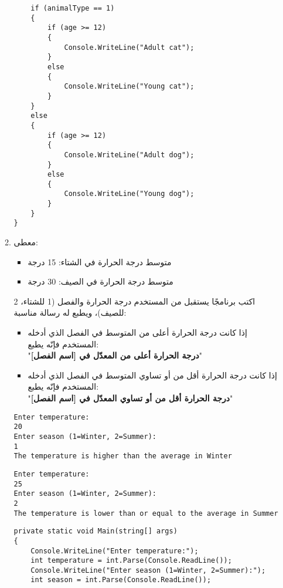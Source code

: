 \documentclass[12pt, twoside]{article}
\begin{document}
\begin{enumerate}[itemsep=3em]
\begin{enumerate}
\begin{solution}
\begin{english}
\begin{verbatim}
    if (animalType == 1)
    {
        if (age >= 12)
        {
            Console.WriteLine("Adult cat");
        }
        else
        {
            Console.WriteLine("Young cat");
        }
    }
    else
    {
        if (age >= 12)
        {
            Console.WriteLine("Adult dog");
        }
        else
        {
            Console.WriteLine("Young dog");
        }
    }
}
\end{verbatim}
\end{english}
\end{solution}
\clearpage
\fi
\fi

\item
معطى:
\begin{itemize}
\item متوسط درجة الحرارة في الشتاء: 15 درجة
\item متوسط درجة الحرارة في الصيف: 30 درجة
\end{itemize}
اكتب برنامجًا يستقبل من المستخدم درجة الحرارة والفصل (1 للشتاء، 2 للصيف)، ويطبع له رسالة مناسبة:
\begin{itemize}
\item إذا كانت درجة الحرارة أعلى من المتوسط في الفصل الذي أدخله المستخدم فإنّه يطبع: \\ "\textbf{درجة الحرارة أعلى من المعدّل في [اسم الفصل]}"
\item إذا كانت درجة الحرارة أقل من أو تساوي المتوسط في الفصل الذي أدخله المستخدم فإنّه يطبع: \\ "\textbf{درجة الحرارة أقل من أو تساوي المعدّل في [اسم الفصل]}"
\end{itemize}
\ifdetailed
\begin{example}[1]
\begin{english}
\begin{verbatim}
Enter temperature:
20
Enter season (1=Winter, 2=Summer):
1
The temperature is higher than the average in Winter
\end{verbatim}
\end{english}
\end{example}
\begin{example}[2]
\begin{english}
\begin{verbatim}
Enter temperature:
25
Enter season (1=Winter, 2=Summer):
2
The temperature is lower than or equal to the average in Summer
\end{verbatim}
\end{english}
\end{example}

\ifwithsols
\begin{solution}
\begin{english}
\begin{verbatim}
private static void Main(string[] args)
{
    Console.WriteLine("Enter temperature:");
    int temperature = int.Parse(Console.ReadLine());
    Console.WriteLine("Enter season (1=Winter, 2=Summer):");
    int season = int.Parse(Console.ReadLine());


\end{verbatim}
\end{english}
\end{solution}
\end{enumerate}
\end{enumerate}
\end{document}
